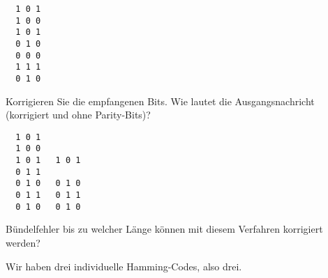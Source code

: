 \begin{enumerate}[(a)]
\begin{verbatim}
  1 0 1
  1 0 0
  1 0 1
  0 1 0
  0 0 0
  1 1 1
  0 1 0
\end{verbatim}

            Korrigieren Sie die empfangenen Bits. Wie lautet die Ausgangsnachricht
            (korrigiert und ohne Parity-Bits)?

\begin{verbatim}
  1 0 1
  1 0 0
  1 0 1   1 0 1
  0 1 1
  0 1 0   0 1 0
  0 1 1   0 1 1
  0 1 0   0 1 0
\end{verbatim}

            Bündelfehler bis zu welcher Länge können mit diesem Verfahren korrigiert
            werden?

            Wir haben drei individuelle Hamming-Codes, also drei.

\end{enumerate}

